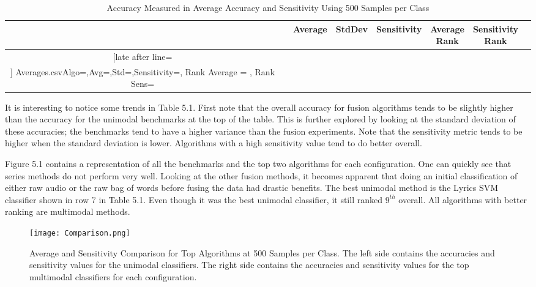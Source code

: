 \begin{table}
\centering
\footnotesize{
	\hskip-1.0in
	  \caption{Accuracy Measured in Average Accuracy and Sensitivity Using 500 Samples per Class }
	\begin{tabular}{| c | l | c | l | c  ||  c | c | c}\hline%
	& & Average & StdDev & Sensitivity &\pbox{20cm}{ Average\\ Rank \\} & \pbox{20cm}{ Sensitivity\\ Rank \\} \\\hline \csvreader[late after line=\\\hline]%
	{Averages.csv}{Algo=\name,Avg=\avg,Std=\std,Sensitivity=\mte, Rank Average = \ravg, Rank Sens=\rmonte}%
	{\thecsvrow &  \name & \avg & \std & \mte & \ravg & \rmonte}%
	\end{tabular}
}
\end{table}

\newpage

It is interesting to notice some trends in Table 5.1. First note that the overall accuracy for fusion 
algorithms tends to be slightly higher than the accuracy for the unimodal benchmarks at the 
top of the table.  This is further explored by looking at the standard deviation of these 
accuracies; the benchmarks tend to have a higher variance than the fusion experiments. 
Note that the sensitivity metric tends to be higher when the standard deviation is lower.  
Algorithms with a high sensitivity value tend to do better overall.


Figure 5.1 contains a representation of all the benchmarks and the top two algorithms for each configuration.  One can quickly see that 
series methods do not perform very well. Looking at the other fusion methods, it becomes apparent that doing an initial classification
 of either raw audio or the raw bag of words before fusing the data had drastic benefits.   The best unimodal method is the Lyrics SVM classifier shown in row 7 in Table 5.1. Even
 though it was the best unimodal classifier, it still ranked  $9^{th}$ overall. All algorithms with better ranking are multimodal methods. 

\begin{figure}
\centering
\texttt{[image: Comparison.png]}
\caption{Average and Sensitivity Comparison for Top Algorithms at 500 Samples per Class. The left side contains the accuracies and sensitivity values for the unimodal classifiers. The right side contains the accuracies and sensitivity values for the top multimodal classifiers for each configuration.}
\end{figure}

